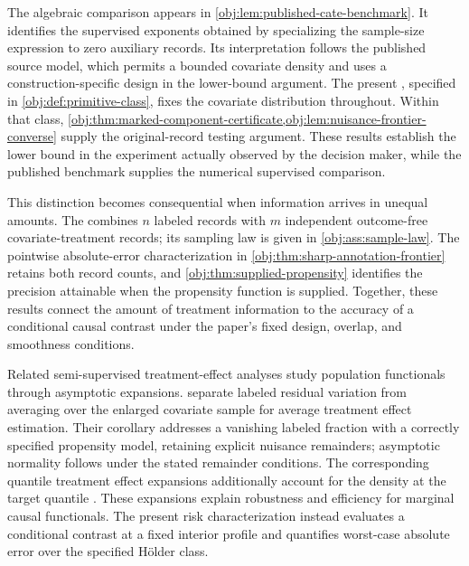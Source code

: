 \documentclass[11pt]{article}
\begin{document}
The algebraic comparison appears in \cref{obj:lem:published-cate-benchmark}. It identifies the supervised exponents obtained by specializing the sample-size expression to zero auxiliary records. Its interpretation follows the published source model, which permits a bounded covariate density and uses a construction-specific design in the lower-bound argument. The present , specified in \cref{obj:def:primitive-class}, fixes the covariate distribution throughout. Within that class, \cref{obj:thm:marked-component-certificate,obj:lem:nuisance-frontier-converse} supply the original-record testing argument. These results establish the lower bound in the experiment actually observed by the decision maker, while the published benchmark supplies the numerical supervised comparison.

This distinction becomes consequential when information arrives in unequal amounts. The  combines \(n\) labeled records with \(m\) independent outcome-free covariate-treatment records; its sampling law is given in \cref{obj:ass:sample-law}. The pointwise absolute-error characterization in \cref{obj:thm:sharp-annotation-frontier} retains both record counts, and \cref{obj:thm:supplied-propensity} identifies the precision attainable when the propensity function is supplied. Together, these results connect the amount of treatment information to the accuracy of a conditional causal contrast under the paper's fixed design, overlap, and smoothness conditions.

Related semi-supervised treatment-effect analyses study population functionals through asymptotic expansions. \citet[Theorem 2.1 and Corollary 2.1]{ChakraborttyDai2022} separate labeled residual variation from averaging over the enlarged covariate sample for average treatment effect estimation. Their corollary addresses a vanishing labeled fraction with a correctly specified propensity model, retaining explicit nuisance remainders; asymptotic normality follows under the stated remainder conditions. The corresponding quantile treatment effect expansions additionally account for the density at the target quantile \citep[Theorem 3.1 and Corollary 3.1]{ChakraborttyDai2022}. These expansions explain robustness and efficiency for marginal causal functionals. The present risk characterization instead evaluates a conditional contrast at a fixed interior profile and quantifies worst-case absolute error over the specified H\"older class.
\end{document}
